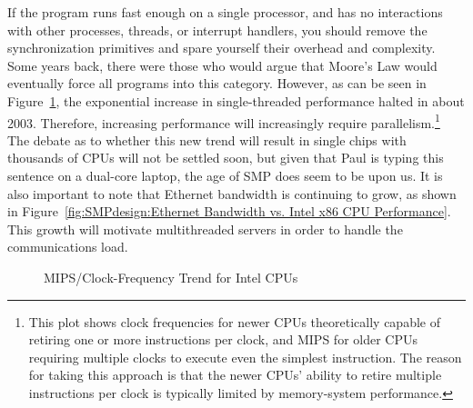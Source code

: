 If the program runs fast enough on a single processor, and
has no interactions with other processes, threads, or interrupt
handlers, you should
remove the synchronization primitives and spare yourself their
overhead and complexity.
Some years back, there were those who would argue that Moore's Law
would eventually force all programs into this category.
However,
as can be seen in
Figure~\ref{fig:SMPdesign:Clock-Frequency Trend for Intel CPUs},
the exponential increase in single-threaded performance halted in
about 2003.
Therefore,
increasing performance will increasingly require parallelism.\footnote{
	This plot shows clock frequencies for newer CPUs theoretically
	capable of retiring one or more instructions per clock, and MIPS for
	older CPUs requiring multiple clocks to execute even the
	simplest instruction.
	The reason for taking this approach is that the newer CPUs'
	ability to retire multiple instructions per clock is typically
	limited by memory-system performance.}
The debate as to whether this new trend will result in single chips
with thousands
of CPUs will not be settled soon, but given that Paul is typing this
sentence on a dual-core laptop, the age of SMP does seem to be upon us.
It is also important to note that Ethernet bandwidth is continuing
to grow, as shown in
Figure~\ref{fig:SMPdesign:Ethernet Bandwidth vs. Intel x86 CPU Performance}.
This growth will motivate multithreaded servers in order to handle
the communications load.

\begin{figure}[htb]
\begin{center}
\end{center}
\caption{MIPS/Clock-Frequency Trend for Intel CPUs}
\label{fig:SMPdesign:Clock-Frequency Trend for Intel CPUs}
\end{figure}

